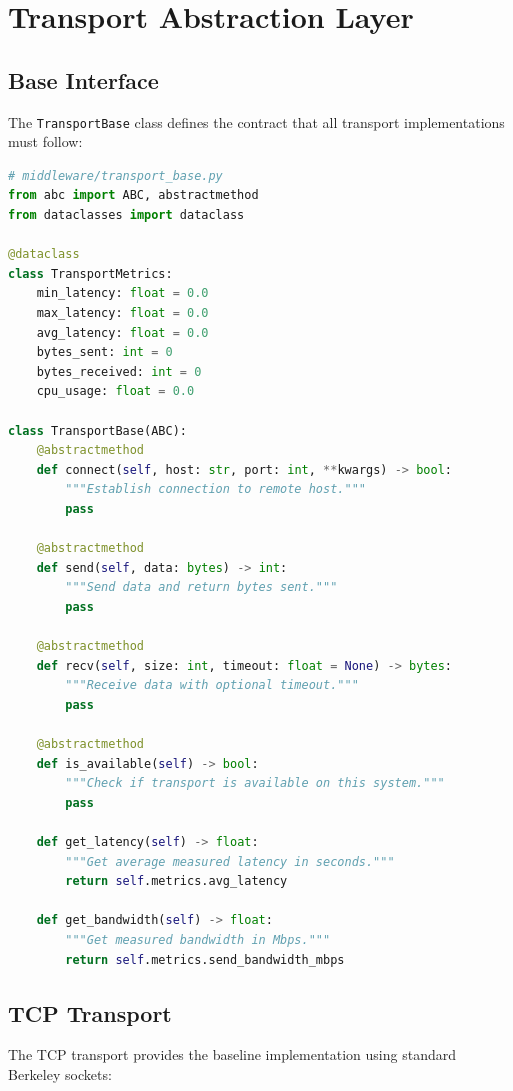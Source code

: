 \documentclass[10pt,letterpaper]{article}
\begin{document}
\section{Transport Abstraction Layer}

\subsection{Base Interface}

The \texttt{TransportBase} class defines the contract that all transport implementations must follow:

\begin{lstlisting}[language=Python]
# middleware/transport_base.py
from abc import ABC, abstractmethod
from dataclasses import dataclass

@dataclass
class TransportMetrics:
    min_latency: float = 0.0
    max_latency: float = 0.0
    avg_latency: float = 0.0
    bytes_sent: int = 0
    bytes_received: int = 0
    cpu_usage: float = 0.0

class TransportBase(ABC):
    @abstractmethod
    def connect(self, host: str, port: int, **kwargs) -> bool:
        """Establish connection to remote host."""
        pass

    @abstractmethod
    def send(self, data: bytes) -> int:
        """Send data and return bytes sent."""
        pass

    @abstractmethod
    def recv(self, size: int, timeout: float = None) -> bytes:
        """Receive data with optional timeout."""
        pass

    @abstractmethod
    def is_available(self) -> bool:
        """Check if transport is available on this system."""
        pass

    def get_latency(self) -> float:
        """Get average measured latency in seconds."""
        return self.metrics.avg_latency

    def get_bandwidth(self) -> float:
        """Get measured bandwidth in Mbps."""
        return self.metrics.send_bandwidth_mbps
\end{lstlisting}

\subsection{TCP Transport}

The TCP transport provides the baseline implementation using standard Berkeley sockets:
\end{document}
